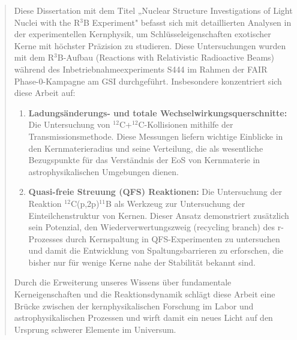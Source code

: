 \documentclass[12pt, a4paper]{article}
\begin{document}
\begin{abstract}
\par
Diese Dissertation mit dem Titel „Nuclear Structure Investigations of Light Nuclei with the R$^3$B Experiment" befasst sich mit detaillierten Analysen in der experimentellen Kernphysik, um Schlüsseleigenschaften exotischer Kerne mit höchster Präzision zu studieren. Diese Untersuchungen wurden mit dem R$^3$B-Aufbau (Reactions with Relativistic Radioactive Beams) während des Inbetriebnahmeexperiments S444 im Rahmen der FAIR Phase-0-Kampagne am GSI durchgeführt. Insbesondere konzentriert sich diese Arbeit auf:
\begin{enumerate}
    \item \textbf{Ladungsänderungs- und totale Wechselwirkungsquerschnitte:} Die Untersuchung von $^{12}$C+$^{12}$C-Kollisionen mithilfe der Transmissionsmethode. Diese Messungen liefern wichtige Einblicke in den Kernmaterieradius und seine Verteilung, die als wesentliche Bezugspunkte für das Verständnis der EoS von Kernmaterie in astrophysikalischen Umgebungen dienen.
    \item \textbf{Quasi-freie Streuung (QFS) Reaktionen:} Die Untersuchung der Reaktion $^{12}$C(p,2p)$^{11}$B als Werkzeug zur Untersuchung der Einteilchenstruktur von Kernen. Dieser Ansatz demonstriert zusätzlich sein Potenzial, den Wiederverwertungszweig (recycling branch) des r-Prozesses durch Kernspaltung in QFS-Experimenten zu untersuchen und damit die Entwicklung von Spaltungsbarrieren zu erforschen, die bisher nur für wenige Kerne nahe der Stabilität bekannt sind.
\end{enumerate}
Durch die Erweiterung unseres Wissens über fundamentale Kerneigenschaften und die Reaktionsdynamik schlägt diese Arbeit eine Brücke zwischen der kernphysikalischen Forschung im Labor und astrophysikalischen Prozessen und wirft damit ein neues Licht auf den Ursprung schwerer Elemente im Universum.
\end{abstract}
\end{document}
